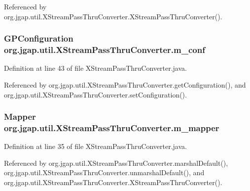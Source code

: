 Referenced by org.\-jgap.\-util.\-X\-Stream\-Pass\-Thru\-Converter.\-X\-Stream\-Pass\-Thru\-Converter().

\hypertarget{classorg_1_1jgap_1_1util_1_1_x_stream_pass_thru_converter_a9c910a3205c4a8cce489e8acddf089f0}{
\subsubsection[{m\-\_\-conf}]{\setlength{\rightskip}{0pt plus 5cm}G\-P\-Configuration org.\-jgap.\-util.\-X\-Stream\-Pass\-Thru\-Converter.\-m\-\_\-conf\hspace{0.3cm}{\ttfamily [private]}}}\label{classorg_1_1jgap_1_1util_1_1_x_stream_pass_thru_converter_a9c910a3205c4a8cce489e8acddf089f0}


Definition at line 43 of file X\-Stream\-Pass\-Thru\-Converter.\-java.



Referenced by org.\-jgap.\-util.\-X\-Stream\-Pass\-Thru\-Converter.\-get\-Configuration(), and org.\-jgap.\-util.\-X\-Stream\-Pass\-Thru\-Converter.\-set\-Configuration().

\hypertarget{classorg_1_1jgap_1_1util_1_1_x_stream_pass_thru_converter_a9e7f796278d14f428fb555dfadace1a9}{
\subsubsection[{m\-\_\-mapper}]{\setlength{\rightskip}{0pt plus 5cm}Mapper org.\-jgap.\-util.\-X\-Stream\-Pass\-Thru\-Converter.\-m\-\_\-mapper\hspace{0.3cm}{\ttfamily [private]}}}\label{classorg_1_1jgap_1_1util_1_1_x_stream_pass_thru_converter_a9e7f796278d14f428fb555dfadace1a9}


Definition at line 35 of file X\-Stream\-Pass\-Thru\-Converter.\-java.



Referenced by org.\-jgap.\-util.\-X\-Stream\-Pass\-Thru\-Converter.\-marshal\-Default(), org.\-jgap.\-util.\-X\-Stream\-Pass\-Thru\-Converter.\-unmarshal\-Default(), and org.\-jgap.\-util.\-X\-Stream\-Pass\-Thru\-Converter.\-X\-Stream\-Pass\-Thru\-Converter().

